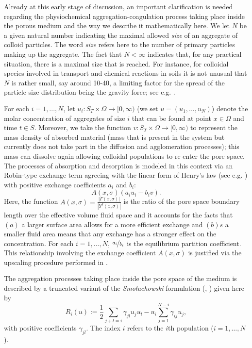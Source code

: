 \documentclass[reqno, 11pt]{amsart}
\numberwithin{equation}{section}
\begin{document}
Already at this early stage of discussion, an important clarification is needed regarding the physiochemical aggregation-coagulation process taking place inside the porous medium and the way we describe it mathematically here. We let $N$ be a given natural number indicating the maximal allowed {\em size} of an aggregate of colloid particles. 
The word {\em size} refers here to the number of primary particles making up the aggregate. The fact that $N<\infty$ indicates that, for any practical situation, there is a maximal size that is reached. For instance, for colloidal species involved in transport and chemical reactions in soils it is not unusual that $N$ is rather small, say around 10-40, a limiting factor for the spread of the particle size distribution being the gravity force; see e.g. \cite{Krehel, Kai,Zech}.

For each $i=1,...,N$, let $u_i\colon S_T\times\Omega\to[0,\infty)$ (we set $u=(u_1,...,u_N)$) denote the molar concentration of aggregates of size $i$  that can be found at point $x\in\Omega$ and time $t\in S$.
Moreover, we take the function $v\colon S_T\times\Omega\to[0,\infty)$ to represent the mass density of absorbed material (mass that is present in the system but currently does not take part in the diffusion and agglomeration processes); this mass can dissolve again allowing colloidal populations to re-enter the pore space. The processes of absorption and desorption is modeled in this context via an Robin-type exchange term agreeing with the linear form of Henry's law (see e.g. \cite{Helmig97,Krehel}) with positive exchange coefficients $a_i$ and $b_i$:
$$
A(x,\sigma) (a_i u_i-b_iv).
$$
Here, the function $A(x,\sigma)=\frac{|\Gamma(x,\sigma)|}{|Y^f(x,\sigma)|}$ is the ratio of the pore space boundary length over the effective volume fluid space and it accounts for the facts that $(a)$ a larger surface area allows for a more efficient exchange and $(b)s$ a smaller fluid area means that any exchange has a stronger effect on the concentration.
For each $i=1,...,N$, $\nicefrac{a_i}{b_i}$ is the equilibrium partition coefficient.
This relationship involving the exchange coefficient $A(x,\sigma)$ is justified via the upscaling procedure performed in \cite{MC20}.

The aggregation processes taking place inside the pore space of the medium is described by a truncated  variant of the {\em Smoluchowski}
 formulation (\cite{Aldous}, \cite{NEM23}) given here by
\begin{equation}\label{smoluchowski}
R_i(u):=\frac{1}{2}\sum_{j+l=i}\gamma_{jl}u_ju_l-u_i\sum_{j=1}^{N-i}\gamma_{ij}u_j,
\end{equation}
with positive coefficients $\gamma_{jl}$.
The index $i$ refers to the $i$th population ($i=1,\dots,N$). 
\end{document}
